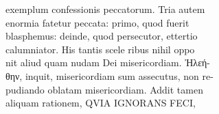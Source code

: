 \documentclass{article}
\begin{document}
\begin{pages}
                exemplum confessionis peccatorum. Tria autem \\
                enormia fatetur peccata: primo, quod fuerit \\
                blasphemus: deinde, quod persecutor, ettertio \\
                calumniator. His tantis scele ribus nihil oppo \\
                nit aliud quam nudam Dei misericordiam. Ἠλεή- \\
                θην, inquit, misericordiam sum assecutus, non re- \\
                pudiando oblatam misericordiam. Addit tamen \\
                aliquam rationem, QVIA IGNORANS FECI, \\
                

\end{pages}
\end{document}
